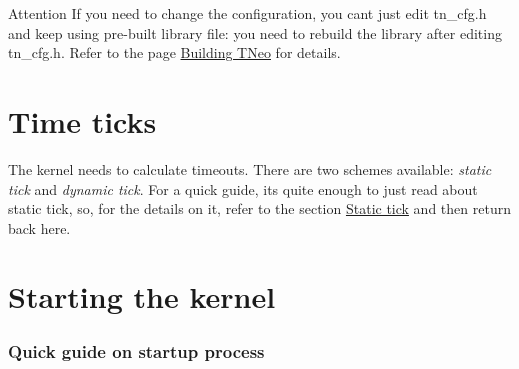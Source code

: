 \begin{DoxyAttention}{Attention}
If you need to change the configuration, you can\textquotesingle{}t just edit {\ttfamily tn\+\_\+cfg.\+h} and keep using pre-\/built library file\+: you need to rebuild the library after editing {\ttfamily tn\+\_\+cfg.\+h}. Refer to the page \hyperlink{building}{Building T\+Neo} for details.
\end{DoxyAttention}
\hypertarget{quick_guide_quick_guide__time_ticks}{}\section{Time ticks}\label{quick_guide_quick_guide__time_ticks}
The kernel needs to calculate timeouts. There are two schemes available\+: {\itshape static tick} and {\itshape dynamic tick}. For a quick guide, it\textquotesingle{}s quite enough to just read about static tick, so, for the details on it, refer to the section \hyperlink{time_ticks_time_ticks__static_tick}{Static tick} and then return back here.\hypertarget{quick_guide_starting_the_kernel}{}\section{Starting the kernel}\label{quick_guide_starting_the_kernel}
\subsubsection*{Quick guide on startup process}


